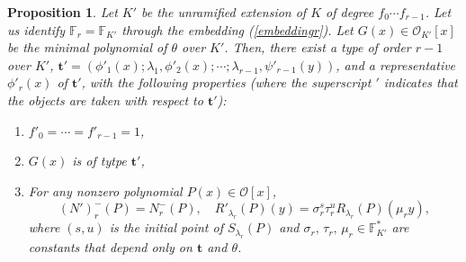 \documentclass{amsart}
\newtheorem{proposition}[theorem]{Proposition}
\def\ff#1{\mathbb{F}_{#1}}
\def\la{\lambda}
\def\oo{{\mathcal O}}
\def\t{\theta}
\def\ty{\mathbf{t}}
\def\zpx{\oo[x]}
\begin{document}
\begin{proposition}\label{extensionr}
Let $K'$ be the unramified extension of $K$ of degree $f_0\cdots f_{r-1}$. Let us identify $\ff{r}=\ff{K'}$ through the embedding (\ref{embeddingr}). Let $G(x)\in \oo_{K'}[x]$ be the minimal polynomial of $\t$ over $K'$. Then, there exist a type of order $r-1$ over $K'$, $\ty'=(\phi'_1(x);\la_1,\phi'_2(x);\cdots;\la_{r-1},\psi'_{r-1}(y))$, and a representative $\phi'_r(x)$ of $\ty'$, with the following properties (where the superscript $'$ indicates that the objects are taken with respect to $\ty'$): 
\begin{enumerate}
 \item $f'_0=\cdots =f'_{r-1}=1$, 
\item $G(x)$ is of tytpe $\ty'$,
\item For any nonzero polynomial $P(x)\in\zpx$, 
$$(N')_r^-(P)=N_r^-(P), \quad R'_{\la_r}(P)(y)=\sigma_r^s\tau_r^u R_{\la_r}(P)(\mu_ry),$$
where $(s,u)$ is the initial point of $S_{\la_r}(P)$ and $\sigma_r,\,\tau_r,\,\mu_r\in\ff{K'}^*$ are constants that depend only on $\ty$ and $\t$.
\end{enumerate}
\end{proposition}
\end{document}
